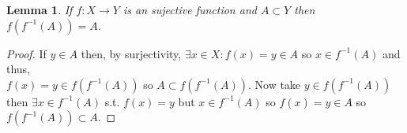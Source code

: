 \documentclass[12pt]{extarticle}
\newcommand{\invI}[2]{#1^{-1} \left( #2 \right)}
\newtheorem{lemma}[theorem]{Lemma}
\begin{document}
\begin{lemma} \label{invsurj}
If $f : X \rightarrow Y$ is an sujective function and $A \subset Y$ then $f(\invI{f}{A}) = A$. 
\end{lemma}
\begin{proof}
If $y \in A$ then, by surjectivity, $\exists x \in X : f(x) = y \in A$ so $x \in \invI{f}{A}$ and thus, \\ $f(x) = y \in f(\invI{f}{A})$ so $A \subset f(\invI{f}{A})$. Now take $y \in f(\invI{f}{A})$ then $\exists x \in \invI{f}{A}$ s.t. $f(x) = y$ but $x \in \invI{f}{A}$ so $f(x) = y \in A$ so $f(\invI{f}{A}) \subset A$. 
\end{proof}
\end{document}
